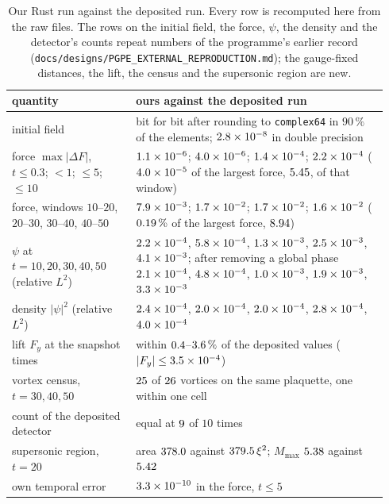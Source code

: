 \begin{table}[t]\centering\small
\begin{tabular}{@{}p{0.31\linewidth}p{0.63\linewidth}@{}}\toprule
quantity & ours against the deposited run\\\midrule
initial field & bit for bit after rounding to \texttt{complex64} in $90\,\%$ of the elements; $2.8\times10^{-8}$ in double precision\\
force $\max|\Delta F|$, $t\le0.3$; $<1$; $\le5$; $\le10$ & $1.1\times10^{-6}$; $4.0\times10^{-6}$; $1.4\times10^{-4}$; $2.2\times10^{-4}$ ($4.0\times10^{-5}$ of the largest force, $5.45$, of that window)\\
force, windows $10$--$20$, $20$--$30$, $30$--$40$, $40$--$50$ & $7.9\times10^{-3}$; $1.7\times10^{-2}$; $1.7\times10^{-2}$; $1.6\times10^{-2}$ ($0.19\,\%$ of the largest force, $8.94$)\\
$\psi$ at $t=10,20,30,40,50$ (relative $L^2$) & $2.2\times10^{-4}$, $5.8\times10^{-4}$, $1.3\times10^{-3}$, $2.5\times10^{-3}$, $4.1\times10^{-3}$; after removing a global phase $2.1\times10^{-4}$, $4.8\times10^{-4}$, $1.0\times10^{-3}$, $1.9\times10^{-3}$, $3.3\times10^{-3}$\\
density $|\psi|^2$ (relative $L^2$) & $2.4\times10^{-4}$, $2.0\times10^{-4}$, $2.0\times10^{-4}$, $2.8\times10^{-4}$, $4.0\times10^{-4}$\\
lift $F_y$ at the snapshot times & within $0.4$--$3.6\,\%$ of the deposited values ($|F_y|\le3.5\times10^{-4}$)\\
vortex census, $t=30,40,50$ & $25$ of $26$ vortices on the same plaquette, one within one cell\\
count of the deposited detector & equal at $9$ of $10$ times\\
supersonic region, $t=20$ & area $378.0$ against $379.5\,\xi^2$; $M_{\max}$ $5.38$ against $5.42$\\
own temporal error & $3.3\times10^{-10}$ in the force, $t\le5$\\\bottomrule
\end{tabular}
\caption{Our Rust run against the deposited run. Every row is recomputed here from the raw files. The rows on the initial field, the force, $\psi$, the density and the detector's counts repeat numbers of the programme's earlier record (\texttt{docs/designs/PGPE\_EXTERNAL\_REPRODUCTION.md}); the gauge-fixed distances, the lift, the census and the supersonic region are new.}\label{ch09:tab-repro}
\end{table}

